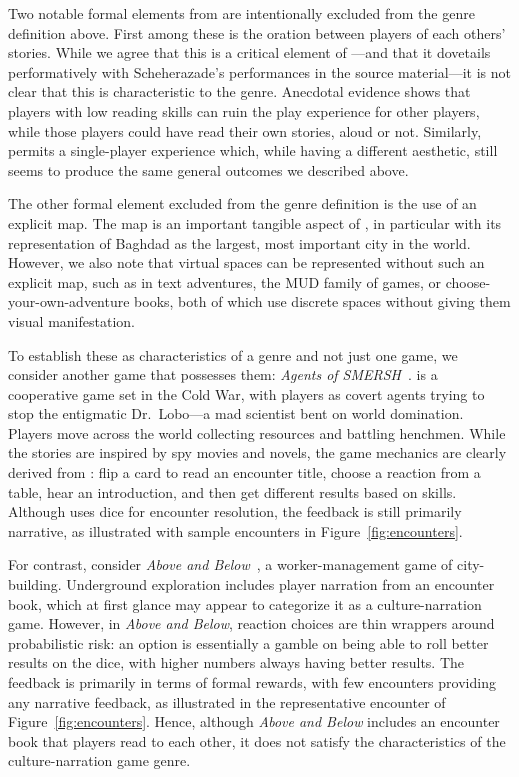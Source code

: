 \documentclass[a4paper]{article}
\begin{document}
Two notable formal elements from \totan{} are intentionally excluded from the
genre definition above. First among these is the oration between players
of each others' stories. While we agree that this is a critical element of 
\totan{}---and that it dovetails performatively 
with Scheherazade's
performances in the source material---it is not clear that this is
characteristic to the genre.  Anecdotal evidence shows that
players with low reading skills can ruin the play experience for other
players, while those players could have read their own stories, aloud or not.
Similarly, \totan{} permits a single-player experience which, while
having a different aesthetic, still seems to produce the same general outcomes
we described above.

The other formal element excluded from the genre definition is the use of an
explicit map. The map is an important tangible aspect of \totan{}, 
in particular with its representation of Baghdad as the largest, most
important city in the world. 
However, we also note that virtual spaces
can be represented without such an explicit map, such as in text adventures,
the MUD family of games, or choose-your-own-adventure books, both of which
use discrete spaces without giving them visual manifestation.

To establish these as characteristics of a genre and not just one game,
we consider another game that possesses them: 
\textit{Agents of SMERSH}~\citep{Maxwell2012}.
\smersh{} is a cooperative game set in the Cold War, with players as 
covert agents trying to stop the entigmatic Dr.\ Lobo---a mad scientist
bent on world domination.
Players move across the world collecting resources and battling henchmen.
While the stories are inspired by spy movies and novels,
the game mechanics are clearly derived from \totan{}: flip a card to read an
encounter title, choose a reaction from a table, hear an introduction,
and then get different results based on skills.
Although \smersh{} uses dice for encounter resolution, the feedback is still
primarily narrative, as illustrated with sample encounters in
Figure~\ref{fig:encounters}.

For contrast, consider \textit{Above and Below}~\citep{Laukat2015}, a
worker-management game of city-building.  
Underground exploration includes player narration
from an encounter book, which at first
glance may appear to categorize it as a culture-narration game.
However, in \textit{Above and Below}, reaction choices are thin
wrappers around probabilistic risk:
an option is essentially a gamble on being able to roll better
results on the dice, with higher numbers always having better results.
The feedback is primarily in terms of formal rewards, with few
encounters providing any narrative feedback, as illustrated in
the representative encounter of Figure~\ref{fig:encounters}.
Hence, although \textit{Above and Below} includes an encounter book
that players read to each other, it does not satisfy the characteristics
of the culture-narration game genre.
\end{document}
